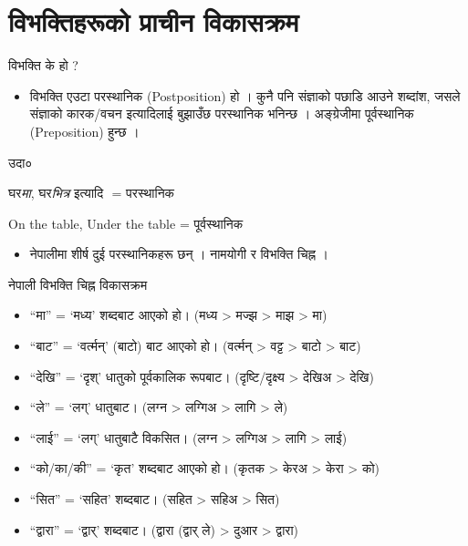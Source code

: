 \documentclass[aspectratio=169, 12pt]{beamer}
\begin{document}
\section{विभक्तिहरूको प्राचीन विकासक्रम}

\begin{frame}[fragile]{विभक्ति के हो ?}{}

\begin{itemize}
\item विभक्ति एउटा परस्थानिक (Postposition) हो । कुनै पनि संज्ञाको पछाडि आउने शब्दांश, जसले संज्ञाको कारक/वचन इत्यादिलाई बुझाउँछ परस्थानिक भनिन्छ । अङ्ग्रेजीमा पूर्वस्थानिक (Preposition) हुन्छ ।


\end{itemize}
\begin{exampleblock}{उदा०}

घर\textit{मा}, घर\textit{भित्र} इत्यादि ‍ = परस्थानिक

On the table, Under the table = पूर्वस्थानिक

\end{exampleblock}

\begin{itemize}
\item नेपालीमा शीर्ष दुई परस्थानिकहरू छन् । नामयोगी र विभक्ति चिह्न ।


\end{itemize}
\end{frame}

\begin{frame}[fragile]{नेपाली विभक्ति चिह्न विकासक्रम}{}

\begin{itemize}
\item ``मा'' = `मध्य' शब्दबाट आएको हो। (मध्य > मज्झ > माझ > मा)


\item ``बाट'' = `वर्त्मन्' (बाटो) बाट आएको हो। (वर्त्मन् > वट्ट > बाटो > बाट)


\item ``देखि'' = `दृश्' धातुको पूर्वकालिक रूपबाट। (दृष्टि/दृक्ष्य > देखिअ > देखि)


\item ``ले'' = `लग्' धातुबाट। (लग्न > लग्गिअ > लागि > ले)


\item ``लाई'' = `लग्' धातुबाटै विकसित। (लग्न > लग्गिअ > लागि > लाई)


\item ``को/का/की'' = `कृत' शब्दबाट आएको हो। (कृतक > केरअ > केरा > को)


\item ``सित'' = `सहित' शब्दबाट। (सहित > सहिअ > सित)


\item ``द्वारा'' = `द्वार्' शब्दबाट। (द्वारा (द्वार् ले) > दुआर > द्वारा)


\end{itemize}
\end{frame}
\end{document}
